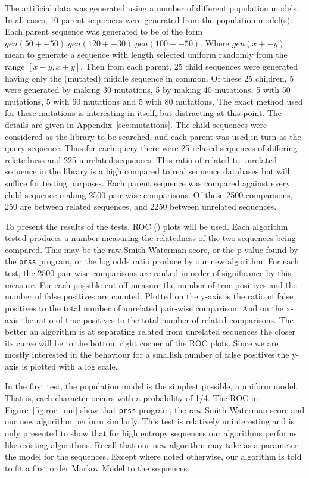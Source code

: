 \documentclass[letterpaper,11pt,oneside]{article}
\begin{document}
The artificial data was generated using a number of different population
models.  In all cases, 10 parent sequences were generated from the population
model(s).  Each parent sequence was generated to be of the form $gen(50+-50)
. gen(120+-30) . gen(100+-50)$.  Where $gen(x+-y)$ mean to generate a sequence
with length selected uniform randomly from the range $[x-y, x+y]$.  Then from
each parent, 25 child sequences were generated having only the (mutated)
middle sequence in common.  Of these 25 children, 5 were generated by making
30 mutations, 5 by making 40 mutations, 5 with 50 mutations, 5 with 60
mutations and 5 with 80 mutations.  The exact method used for these mutations
is interesting in itself, but distracting at this point.  The details are
given in Appendix~\ref{sec:mutations}.  The child sequences were considered as
the library to be searched, and each parent was used in turn as the query
sequence.  Thus for each query there were 25 related sequences of differing
relatedness and 225 unrelated sequences.  This ratio of related to unrelated
sequence in the library is a high compared to real sequence databases but will
suffice for testing purposes.  Each parent sequence was compared against every
child sequence making 2500 pair-wise comparisons.  Of these 2500 comparisons,
250 are between related sequences, and 2250 between unrelated sequences.

To present the results of the tests, ROC (\cite{gribskov96, brenner98}) plots
will be used.  Each algorithm tested produces a number measuring the
relatedness of the two sequences being compared.  This may be the raw
Smith-Waterman score, or the p-value found by the \verb!prss! program, or the
log odds ratio produce by our new algorithm.  For each test, the 2500
pair-wise comparisons are ranked in order of significance by this measure.
For each possible cut-off measure the number of true positives and the number
of false positives are counted.  Plotted on the y-axis is the ratio of false
positives to the total number of unrelated pair-wise comparison.  And on the
x-axis the ratio of true positives to the total number of related comparisons.
The better an algorithm is at separating related from unrelated sequences the
closer its curve will be to the bottom right corner of the ROC plots.  Since
we are mostly interested in the behaviour for a smallish number of false
positives the y-axis is plotted with a log scale.

In the first test, the population model is the simplest possible, a uniform
model.  That is, each character occurs with a probability of 1/4.  The ROC in
Figure~\ref{fig:roc_uni} show that \verb!prss! program, the raw Smith-Waterman
score and our new algorithm perform similarly.  This test is relatively
uninteresting and is only presented to show that for high entropy sequences
our algorithms performs like existing algorithms.  Recall that our new
algorithm may take as a parameter the model for the sequences.  Except where
noted otherwise, our algorithm is told to fit a first order Markov Model to
the sequences.
\end{document}
